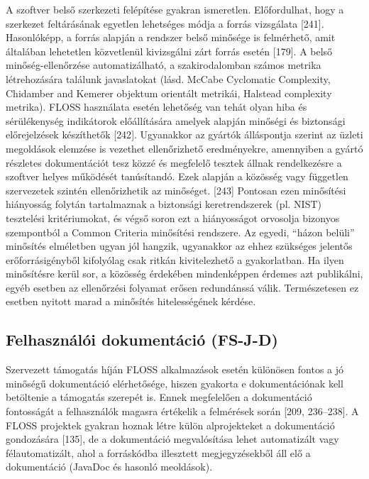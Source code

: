 \documentclass[12pt,magyar,a4paper,oneside]{scrreprt}
\begin{document}
A szoftver belső szerkezeti felépítése gyakran ismeretlen. Előfordulhat,
hogy a szerkezet feltárásának egyetlen lehetséges módja a forrás
vizsgálata {[}241{]}. Hasonlóképp, a forrás alapján a rendszer belső
minősége is felmérhető, amit általában lehetetlen közvetlenül
kivizsgálni zárt forrás esetén {[}179{]}. A belső minőség-ellenőrzése
automatizálható, a szakirodalomban számos metrika létrehozására találunk
javaslatokat (lásd. McCabe Cyclomatic Complexity, Chidamber and Kemerer
objektum orientált metrikái, Halstead complexity metrika). FLOSS
használata esetén lehetőség van tehát olyan hiba és sérülékenység
indikátorok előállítására amelyek alapján minőségi és biztonsági
előrejelzések készíthetők {[}242{]}. Ugyanakkor az gyártók álláspontja
szerint az üzleti megoldások elemzése is vezethet ellenőrizhető
eredményekre, amennyiben a gyártó részletes dokumentációt tesz közzé és
megfelelő tesztek állnak rendelkezésre a szoftver helyes működését
tanúsítandó. Ezek alapján a közösség vagy független szervezetek szintén
ellenőrizhetik az minőséget. {[}243{]} Pontosan ezen minősítési
hiányosság folytán tartalmaznak a biztonsági keretrendszerek (pl. NIST)
tesztelési kritériumokat, és végső soron ezt a hiányosságot orvosolja
bizonyos szempontból a Common Criteria minősítési rendszere. Az egyedi,
``házon belüli'' minősítés elméletben ugyan jól hangzik, ugyanakkor az
ehhez szükséges jelentős erőforrásigényből kifolyólag csak ritkán
kivitelezhető a gyakorlatban. Ha ilyen minősítésre kerül sor, a közösség
érdekében mindenképpen érdemes azt publikálni, egyéb esetben az
ellenőrzési folyamat erősen redundánssá válik. Természetesen ez esetben
nyitott marad a minősítés hitelességének kérdése.

\hypertarget{sec:FS-J-D}{%
\subsection{Felhasználói dokumentáció (FS-J-D)}\label{sec:FS-J-D}}

Szervezett támogatás híján FLOSS alkalmazások esetén különösen fontos a
jó minőségű dokumentáció elérhetősége, hiszen gyakorta e dokumentációnak
kell betöltenie a támogatás szerepét is. Ennek megfelelően a
dokumentáció fontosságát a felhasználók magasra értékelik a felmérések
során {[}209, 236--238{]}. A FLOSS projektek gyakran hoznak létre külön
alprojekteket a dokumentáció gondozására {[}135{]}, de a dokumentáció
megvalósítása lehet automatizált vagy félautomatizált, ahol a
forráskódba illesztett megjegyzésekből áll elő a dokumentáció (JavaDoc
és hasonló meoldások).
\end{document}
